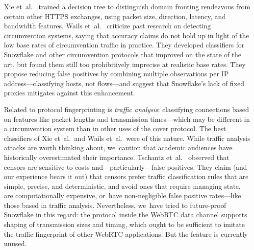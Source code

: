 \documentclass[letterpaper,twocolumn]{article}
\newcommand{\firstterm}[1]{\textit{#1}}
\begin{document}
Xie et~al.~\cite{Xie2023a} trained a decision tree to
distinguish domain fronting rendezvous
from certain other HTTPS exchanges,
using
packet size, direction, latency, and bandwidth features.
Wails et~al.~\cite{Wails2024a}
criticize past research on detecting circumvention systems,
saying that accuracy claims do not hold up
in light of the low base rates of circumvention traffic in practice.
They developed classifiers
for Snowflake and other circumvention protocols
that improved on the state of the art,
but found them still too prohibitively imprecise at realistic base rates.
They propose reducing false positives by combining
multiple observations per IP address---classifying hosts,
not flows---and suggest that Snowflake's lack of
fixed proxies mitigates against this enhancement.

Related to protocol fingerprinting is \firstterm{traffic analysis}:
classifying connections based on features like
packet lengths and transmission times---which
may be different in a circumvention system
than in other uses of the cover protocol.
The best classifiers of Xie et~al.\ and Wails et~al.\ were of this nature.
While traffic analysis attacks are worth thinking about,
we~caution that academic audiences
have historically overestimated their importance.
Tschantz et~al.~\cite[\S VII]{Tschantz2016a} observed
that censors are sensitive to costs
and---particularly---false positives.
They claim (and our experience bears it out)
that censors prefer traffic classification rules
that are simple, precise, and deterministic,
and avoid ones that
require managing state,
are computationally expensive,
or~have non-negligible false positive rates---like
those based in traffic analysis.
Nevertheless, we~have tried to future-proof Snowflake in this regard:
the protocol inside the WebRTC data channel supports
shaping of transmission sizes and timing,
which ought to be sufficient to imitate the traffic fingerprint
of other WebRTC applications.
But the feature is currently unused.
\end{document}
